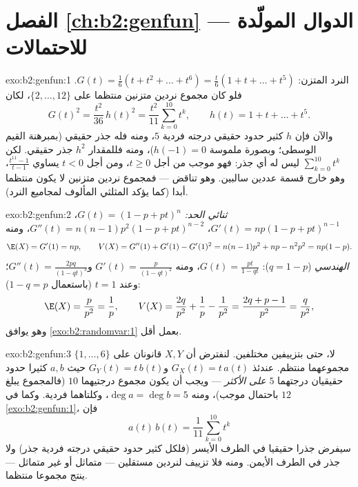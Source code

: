 \section*{الفصل \ref{ch:b2:genfun} --- الدوال المولّدة للاحتمالات}

\begin{solution}{exo:b2:genfun:1}
النرد المتزن: $G(t) = \frac16(t + t^2 + \dots + t^6) = \frac t6(1 + t
+ \dots + t^5)$. فلو كان مجموع نردين متزنين منتظما على $\{2, \dots, 12\}$،
لكان
\[
G(t)^2 = \frac{t^2}{36}\,h(t)^2
= \frac{t^2}{11}\sum_{k=0}^{10}t^k ,
\qquad h(t) = 1 + t + \dots + t^5 .
\]
والآن فإن $h$ كثير حدود حقيقي درجته فردية $5$، ومنه فله جذر
حقيقي (بمبرهنة القيم الوسطى؛ وبصورة ملموسة $h(-1) = 0$)، ومنه فللمقدار
$h^2$ جذر حقيقي. لكن $\sum_{k=0}^{10}t^k$ ليس له أي جذر: فهو موجب من أجل $t \geq 0$، ومن
أجل $t < 0$ يساوي $\frac{t^{11} - 1}{t - 1}$، وهو خارج قسمة عددين سالبين. وهو تناقض ---
فمجموع نردين متزنين لا يكون منتظما أبدا (كما يؤكد  المثلثي
المألوف لمجاميع النرد).
\end{solution}

\begin{solution}{exo:b2:genfun:2}
\emph{ثنائي الحد:} $G(t) = (1 - p + pt)^n$، $G'(t) = np(1 - p +
pt)^{n-1}$، $G''(t) = n(n-1)p^2(1 - p + pt)^{n-2}$، ومنه
\[
\E(X) = G'(1) = np,
\qquad
V(X) = G''(1) + G'(1) - G'(1)^2
= n(n-1)p^2 + np - n^2p^2 = np(1-p).
\]
\emph{الهندسي} ($q = 1 - p$): $G(t) = \frac{pt}{1 - qt}$، ومنه $G'(t) = \frac{p}{(1 - qt)^2}$ و$G''(t) = \frac{2pq}{(1 -
qt)^3}$؛ وعند $t = 1$
(باستعمال $1 - q = p$):
\[
\E(X) = \frac{p}{p^2} = \frac1p,
\qquad
V(X) = \frac{2q}{p^2} + \frac1p - \frac{1}{p^2}
= \frac{2q + p - 1}{p^2}
= \frac{q}{p^2} ,
\]
وهو يوافق \cref{exo:b2:randomvar:1} بعمل أقل.
\end{solution}

\begin{solution}{exo:b2:genfun:3}
لا، حتى بتزييفين مختلفين. لنفترض أن $X, Y$ قانونان على $\{1, \dots, 6\}$
مجموعهما منتظم. عندئذ $G_X(t) = t\,a(t)$ و$G_Y(t) = t\,b(t)$ حيث $a, b$ كثيرا حدود حقيقيان
درجتهما $5$ \emph{على الأكثر} --- ويجب أن يكون مجموع درجتيهما
$10$ (فالمجموع يبلغ $12$ باحتمال موجب)، ومنه $\deg a = \deg b = 5$، وكلتاهما
فردية. وكما في \cref{exo:b2:genfun:1}، فإن
\[
a(t)\,b(t) = \frac{1}{11}\sum_{k=0}^{10}t^k
\]
سيفرض جذرا حقيقيا في الطرف الأيسر (فلكل كثير حدود حقيقي درجته فردية
جذر) ولا جذر في الطرف الأيمن. ومنه فلا تزييف لنردين مستقلين ---
متماثل أو غير متماثل --- ينتج مجموعا منتظما.
\end{solution}

